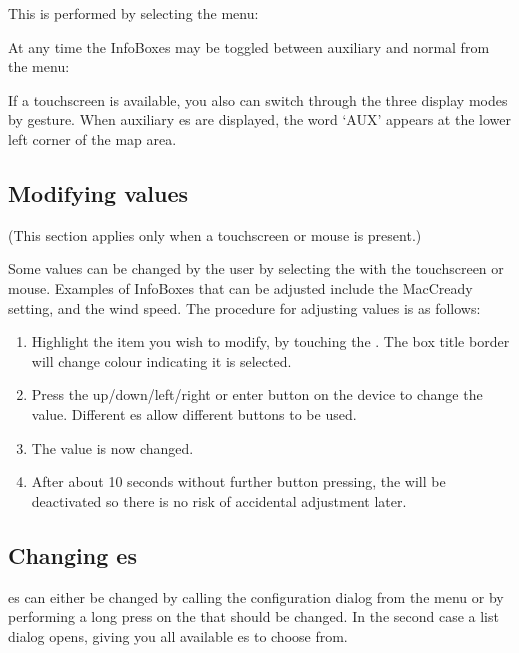\documentclass[a4paper,12pt]{refrep}
\begin{document}
This is performed by selecting the menu:
\begin{quote}
\blink{}
\end{quote}
At any time the InfoBoxes may be toggled between auxiliary and normal from
the menu:
\begin{quote}
\blink{}\blink{}
\end{quote}
If a touchscreen is available, you also can switch through the three display
modes by gesture.
When auxiliary {\InfoBox}es are displayed, the word `AUX' appears at the
lower left corner of the map area.

\subsection*{Modifying {\InfoBox} values}
(This section applies only when a touchscreen or mouse is present.)

Some {\InfoBox} values can be changed by the user by selecting the
{\InfoBox} with the touchscreen or mouse.  Examples of InfoBoxes that can
be adjusted include the MacCready setting, and the wind speed.
The procedure for adjusting {\InfoBox} values is as follows:
\begin{enumerate}
\item Highlight the item you wish to modify, by touching the {\InfoBox}. The box
title border will change colour indicating it is selected.
\item Press the up/down/left/right or enter button on the device
to change the value.  Different {\InfoBox}es allow different buttons to
be used.
\item The value is now changed.
\item After about 10 seconds without further button pressing, the {\InfoBox}
will be deactivated so there is no risk of accidental adjustment later.
\end{enumerate}

\subsection*{Changing {\InfoBox}es}
{\InfoBox}es can either be changed by calling the configuration dialog from the
menu \blink{}\blink{} or by
performing a long press on the {\InfoBox} that should be changed. In the second case a list dialog opens,
giving you all available {\InfoBox}es to choose from.
\end{document}
